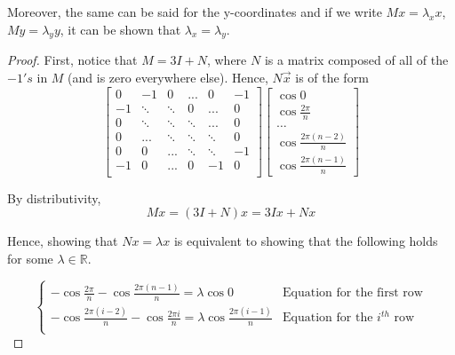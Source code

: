 \documentclass[11pt]{article}
\begin{document}
\bigskip

Moreover, the same can be said for the y-coordinates and if we write $Mx = \lambda_x x$, $My = \lambda_y y$, it can be shown that $\lambda_x = \lambda_y$.

\begin{proof}
    First, notice that $M = 3I + N$, where $N$ is a matrix composed of all of the $-1's$ in $M$ (and is zero everywhere else). Hence, $N\vec{x}$ is of the form
    \[
        \begin{bmatrix}
            0  & -1  & 0   & ... & 0   & -1 \\
            -1 & \ddots   & \ddots  & 0   & ... & 0 \\
            0  & \ddots  & \ddots   & \ddots  & ... & 0 \\
            0  & ... & \ddots   & \ddots  & \ddots   & 0 \\
            0 & 0   & ... & \ddots   & \ddots  & -1 \\
            -1 & 0   & ... & 0   & -1  & 0 \\
        \end{bmatrix}
        \begin{bmatrix}
            \cos{0} \\ 
            \cos{\frac{2 \pi}{n}} \\
            \dots \\
            \cos{\frac{2 \pi(n-2)}{n}} \\
            \cos{\frac{2 \pi(n-1)}{n}}
        \end{bmatrix}
    \]
    
    By distributivity,
    \[
    Mx = (3I + N)x = 3Ix + Nx
    \]
    
    Hence, showing that $Nx = \lambda x$ is equivalent to showing that the following holds for some $\lambda \in \mathbb{R}$.
    
    \[\begin{cases}
        -\cos{\frac{2 \pi}{n}} - \cos{\frac{2\pi(n-1)}{n}} = \lambda \cos{0} &\text{Equation for the first row} \\
        -\cos{\frac{2 \pi (i - 2)}{n}} - \cos{\frac{2 \pi i}{n}} = \lambda \cos{\frac{2\pi(i-1)}{n}}
        &\text{Equation for the $i^{th}$ row} \\
    \end{cases}\]
    

\end{proof}
\end{document}
